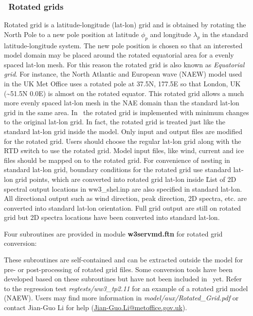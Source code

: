\vssub
\subsubsection{~Rotated grids} \label{sub:num_space_rotagrid}

\noindent
Rotated grid is a latitude-longitude (lat-lon) grid and is obtained by
rotating the North Pole to a new pole position at latitude $\phi_{p}$ and
longitude $\lambda_{p}$ in the standard latitude-longitude system.  The new
pole position is chosen so that an interested model domain may be placed
around the rotated equatorial area for a evenly spaced lat-lon mesh. For this
reason the rotated grid is also known as \emph{Equatorial grid}. For instance,
the North Atlantic and European wave (NAEW) model used in the UK Met Office
uses a rotated pole at 37.5N, 177.5E so that London, UK
(\textasciitilde{}51.5N 0.0E) is almost on the rotated equator. This rotated
grid allows a much more evenly spaced lat-lon mesh in the NAE domain than the
standard lat-lon grid in the same area. In \ws\, the rotated grid is
implemented with minimum changes to the original lat-lon grid. In fact, the
rotated grid is treated just like the standard lat-lon grid inside the
model. Only input and output files are modified for the rotated grid. Users
should choose the regular lat-lon grid along with the RTD switch to use the
rotated grid. Model input files, like wind, current and ice files should be
mapped on to the rotated grid. For convenience of nesting in standard lat-lon
grid, boundary conditions for the rotated grid use standard lat-lon grid
points, which are converted into rotated grid lat-lon inside \ws\.  List of 2D
spectral output locations in ww3\_shel.inp are also specified in standard
lat-lon. All directional output such as wind direction, peak direction, 2D
spectra, etc. are converted into standard lat-lon orientation. Full grid
output are still on rotated grid but 2D spectra locations have been converted
into standard lat-lon.

Four subroutines are provided in module {\bf w3servmd.ftn} for rotated grid
conversion:
\begin{vlist}
\end{vlist}
These subroutines are self-contained and can be extracted outside the model
for pre- or post-processing of rotated grid files.  Some conversion tools have
been developed based on these subroutines but have not been included in \ws\
yet. Refer to the regression test \emph{regtests/ww3\_tp2.11} for an example
of a rotated grid model (NAEW).  Users may find more information in
\emph{model/aux/Rotated\_Grid.pdf} or contact Jian-Guo Li for help
(\url{Jian-Guo.Li@metoffice.gov.uk}).
